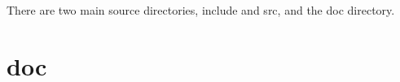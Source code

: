 

There are two main source directories, \textsf{include} and \textsf{src}, and
the \textsf{doc} directory.


\section{\textsf{doc}}
\label{s:doc}

